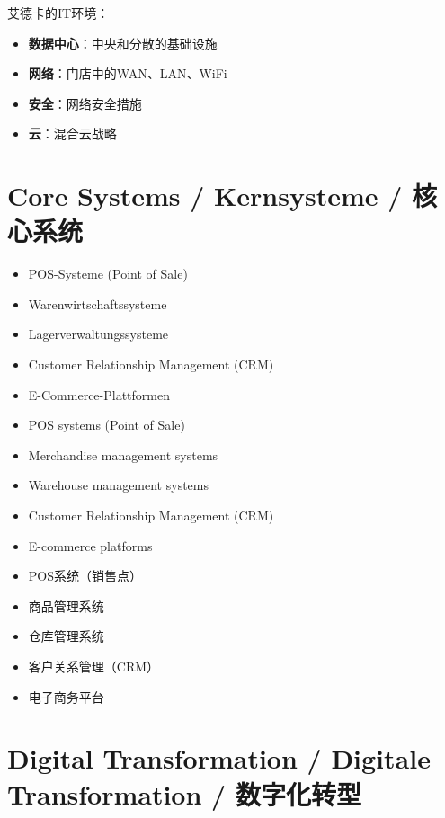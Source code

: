 艾德卡的IT环境：
\begin{itemize}
    \item \textbf{数据中心}：中央和分散的基础设施
    \item \textbf{网络}：门店中的WAN、LAN、WiFi
    \item \textbf{安全}：网络安全措施
    \item \textbf{云}：混合云战略
\end{itemize}

\section{Core Systems / Kernsysteme / 核心系统}

\begin{otherlanguage}{ngerman}
\begin{itemize}
    \item POS-Systeme (Point of Sale)
    \item Warenwirtschaftssysteme
    \item Lagerverwaltungssysteme
    \item Customer Relationship Management (CRM)
    \item E-Commerce-Plattformen
\end{itemize}
\end{otherlanguage}

\begin{itemize}
    \item POS systems (Point of Sale)
    \item Merchandise management systems
    \item Warehouse management systems
    \item Customer Relationship Management (CRM)
    \item E-commerce platforms
\end{itemize}

\begin{itemize}
    \item POS系统（销售点）
    \item 商品管理系统
    \item 仓库管理系统
    \item 客户关系管理（CRM）
    \item 电子商务平台
\end{itemize}

\section{Digital Transformation / Digitale Transformation / 数字化转型}


